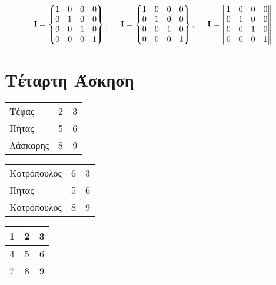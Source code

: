 \documentclass{article}
\begin{document}
\begin{equation}
    \textbf{I} = \begin{Bmatrix}
            1 & 0 & 0 & 0\\
            0 & 1 & 0 & 0\\
            0 & 0 & 1 & 0\\
            0 & 0 & 0 & 1
        \end{Bmatrix}, \hspace{0.5cm}
    \textbf{I} = \begin{Bmatrix}
            1 & 0 & 0 & 0\\
            0 & 1 & 0 & 0\\
            0 & 0 & 1 & 0\\
            0 & 0 & 0 & 1
        \end{Bmatrix}, \hspace{0.5cm}
    \textbf{I} = \begin{Vmatrix}
            1 & 0 & 0 & 0\\
            0 & 1 & 0 & 0\\
            0 & 0 & 1 & 0\\
            0 & 0 & 0 & 1
        \end{Vmatrix}
\end{equation}


\section{Τέταρτη Άσκηση}

\begin{center}
\begin{tabular}{ l l l }
 Τέφας    & 2 & 3 \\ 
 Πήτας    & 5 & 6 \\
 Λάσκαρης & 8 & 9    
\end{tabular}
\end{center}

\begin{center}
\begin{tabular}{ | l | l | l |}
 Κοτρόπουλος    & 6 & 3 \\ 
 Πήτας          & 5 & 6 \\
 Κοτρόπουλος    & 8 & 9    
\end{tabular}
\end{center}

\begin{center}
\begin{tabular}{ | c | c | c |}
 \hline
 1 & 2 & 3 \\ \hline
 4 & 5 & 6 \\ \hline
 7 & 8 & 9 \\ \hline
\end{tabular}
\end{center}
\end{document}
